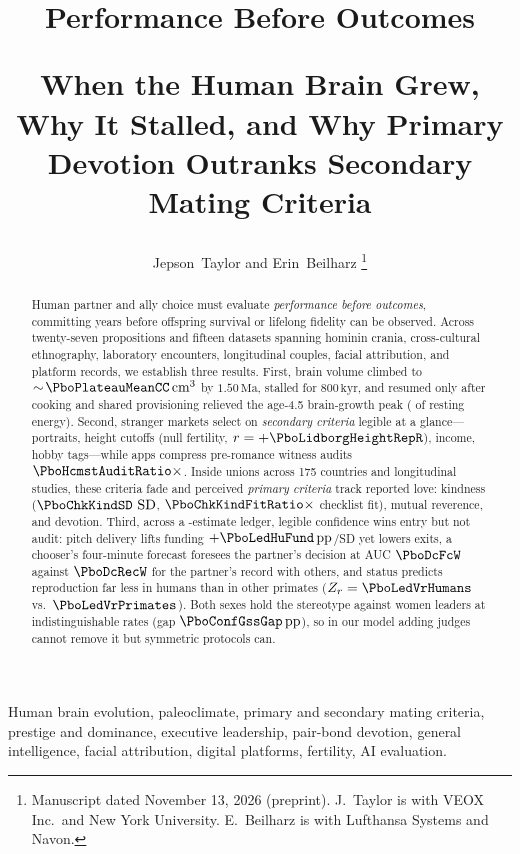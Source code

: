 \documentclass[10pt,journal,twoside]{IEEEtran}
\title{%
{\fontsize{23}{27}\selectfont\bfseries\color{ink}Performance {\color{accentwarm}Before} Outcomes\par}%
\vspace{5pt}%
{\fontsize{11.5}{15}\selectfont\normalfont\color{ink}When the Human Brain Grew, Why It Stalled, and Why Primary Devotion Outranks Secondary Mating Criteria\par}}
\author{Jepson~Taylor and Erin~Beilharz%
\thanks{Manuscript dated November 13, 2026 (preprint). J.~Taylor is with VEOX Inc.\ and New York University. E.~Beilharz is with Lufthansa Systems and Navon.}}
\theoremstyle{plain}
\theoremstyle{remark}
\newcommand{\SD}{\operatorname{SD}}
\newcommand{\ccm}{\,\text{cm}\ensuremath{^3}}
\begin{document}
\maketitle

\begin{abstract}
Human partner and ally choice must evaluate \emph{performance before outcomes}, committing years before offspring survival or lifelong fidelity can be observed. Across twenty-seven propositions and fifteen datasets spanning \FosN{} hominin crania, cross-cultural ethnography, laboratory encounters, longitudinal couples, facial attribution, and \PboThreePlatformRecords{} platform records, we establish three results. First, brain volume climbed to $\sim\!\PboPlateauMeanCC\ccm$ by $1.50\,\mathrm{Ma}$, stalled for $800\,\mathrm{kyr}$, and resumed only after cooking and shared provisioning relieved the age-4.5 brain-growth peak (\PboChildPeakRmr{} of resting energy). Second, stranger markets select on \emph{secondary criteria} legible at a glance---portraits, height cutoffs (null fertility, $r=+\PboLidborgHeightRepR$), income, hobby tags---while apps compress pre-romance witness audits $\PboHcmstAuditRatio\times$. Inside unions across 175 countries and \PboJoelDatasetsN{} longitudinal studies, these criteria fade and perceived \emph{primary criteria} track reported love: kindness ($\PboChkKindSD\,\SD$, $\PboChkKindFitRatio\times$ checklist fit), mutual reverence, and devotion. Third, across a \PboConfLedgerN{}-estimate ledger, legible confidence wins entry but not audit: pitch delivery lifts funding $+\PboLedHuFund\,\mathrm{pp}$/SD yet lowers exits, a chooser's four-minute forecast foresees the partner's decision at AUC $\PboDcFcW$ against $\PboDcRecW$ for the partner's record with others, and status predicts reproduction far less in humans than in other primates ($Z_r=\PboLedVrHumans$ vs.\ $\PboLedVrPrimates$). Both sexes hold the stereotype against women leaders at indistinguishable rates (gap $\PboConfGssGap\,\mathrm{pp}$), so in our model adding judges cannot remove it but symmetric protocols can.
\end{abstract}

\begin{IEEEkeywords}
Human brain evolution, paleoclimate, primary and secondary mating criteria, prestige and dominance, executive leadership, pair-bond devotion, general intelligence, facial attribution, digital platforms, fertility, AI evaluation.
\end{IEEEkeywords}


\end{document}
